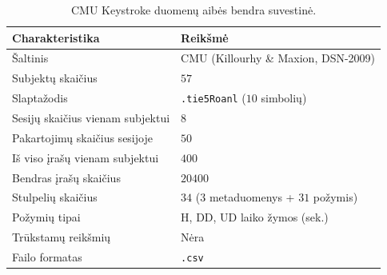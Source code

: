 \begin{table}[H]
    \centering
    \caption{CMU Keystroke duomenų aibės bendra suvestinė.}
    \begin{tabular}{|l|l|}
        \hline
        Charakteristika & Reikšmė \\
        \hline
        Šaltinis & CMU (Killourhy \& Maxion, DSN-2009) \\ \hline
        Subjektų skaičius & $57$ \\ \hline
        Slaptažodis & \texttt{.tie5Roanl} ($10$ simbolių) \\ \hline
        Sesijų skaičius vienam subjektui & $8$ \\ \hline
        Pakartojimų skaičius sesijoje & $50$ \\ \hline
        Iš viso įrašų vienam subjektui & $400$ \\ \hline
        Bendras įrašų skaičius & $20400$ \\ \hline
        Stulpelių skaičius & $34$ ($3$ metaduomenys + $31$ požymis) \\ \hline
        Požymių tipai & H, DD, UD laiko žymos (sek.) \\ \hline
        Trūkstamų reikšmių & Nėra \\ \hline
        Failo formatas & \texttt{.csv} \\ \hline
    \end{tabular}
    \label{tab:keystroke_suvestine}
\end{table}